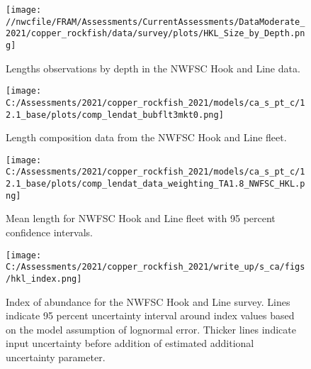\documentclass[11pt,
  english,
  a4paper,
]{article}
\begin{document}
\tagmcend\tagstructend


\begin{figure}
\centering
\texttt{[image: //nwcfile/FRAM/Assessments/CurrentAssessments/DataModerate\_2021/copper\_rockfish/data/survey/plots/HKL\_Size\_by\_Depth.png]}
\caption{Lengths observations by depth in the NWFSC Hook and Line data.\label{fig:hkl-len-dep}}
\end{figure}

\tagmcend\tagstructend


\begin{figure}
\centering
\texttt{[image: C:/Assessments/2021/copper\_rockfish\_2021/models/ca\_s\_pt\_c/12.1\_base/plots/comp\_lendat\_bubflt3mkt0.png]}
\caption{Length composition data from the NWFSC Hook and Line fleet.\label{fig:hkl-len-data}}
\end{figure}

\tagmcend\tagstructend


\begin{figure}
\centering
\texttt{[image: C:/Assessments/2021/copper\_rockfish\_2021/models/ca\_s\_pt\_c/12.1\_base/plots/comp\_lendat\_data\_weighting\_TA1.8\_NWFSC\_HKL.png]}
\caption{Mean length for NWFSC Hook and Line fleet with 95 percent confidence intervals.\label{fig:mean-hkl-len-data}}
\end{figure}

\tagmcend\tagstructend


\begin{figure}
\centering
\texttt{[image: C:/Assessments/2021/copper\_rockfish\_2021/write\_up/s\_ca/figs/hkl\_index.png]}
\caption{Index of abundance for the NWFSC Hook and Line survey. Lines indicate 95 percent uncertainty interval around index values based on the model assumption of lognormal error. Thicker lines indicate input uncertainty before addition of estimated additional uncertainty parameter.\label{fig:hkl-index}}
\end{figure}
\end{document}
